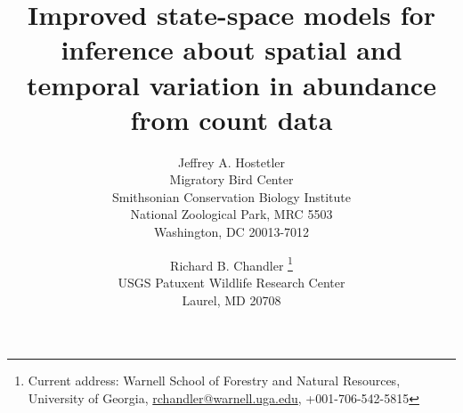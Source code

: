 \documentclass[12pt]{article}
\begin{document}
\title{Improved state-space models for inference about 
spatial and temporal variation in abundance from count data}

\author{Jeffrey A. Hostetler\\ %
        \small Migratory Bird Center \\
        \small Smithsonian Conservation Biology Institute \\
        \small National Zoological Park, MRC 5503 \\
        \small Washington, DC 20013-7012\\
   \and Richard B. Chandler \footnote{Current address: Warnell School of
     Forestry and Natural Resources, University of Georgia,
     \url{rchandler@warnell.uga.edu}, +001-706-542-5815} \\
        \small USGS Patuxent Wildlife Research Center \\
        \small Laurel, MD 20708
}
\maketitle
\end{document}
